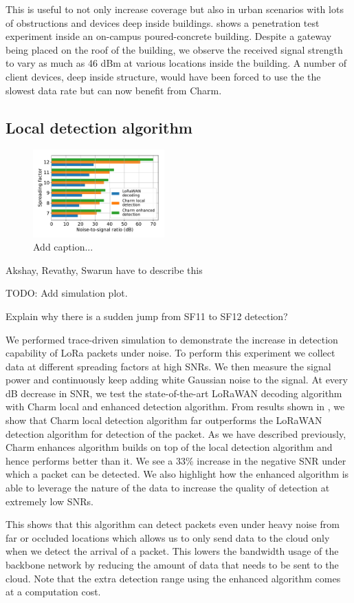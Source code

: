 This is useful to not only increase coverage but also in urban scenarios with lots of obstructions and devices deep inside buildings.  shows a penetration test experiment inside an on-campus poured-concrete building. Despite a gateway being placed on the roof of the building, we observe the received signal strength to vary as much as 46 dBm at various locations inside the building. A number of client devices, deep inside structure, would have been forced to use the the slowest data rate but can now benefit from Charm.

\subsection{Local detection algorithm}
\label{sec:local-detection-eval}

\begin{figure}[!ht]
\centering
\includegraphics[width=0.45\textwidth]{figures/local_detection_limits}
\caption{{\color{blue} Add caption...}}
\label{fig:local-detection}
\end{figure}

{\color{blue} Akshay, Revathy, Swarun have to describe this

TODO: Add simulation plot.

Explain why there is a sudden jump from SF11 to SF12 detection?}

{\color{purple}
We performed trace-driven simulation to demonstrate the increase in detection capability of LoRa packets under noise. To perform this experiment we collect data at different spreading factors at high SNRs. We then measure the signal power and continuously keep adding white Gaussian noise to the signal. At every dB decrease in SNR, we test the state-of-the-art LoRaWAN decoding algorithm with Charm local and enhanced detection algorithm. From results shown in , we show that Charm local detection algorithm far outperforms the LoRaWAN detection algorithm for detection of the packet. As we have described previously, Charm enhances algorithm builds on top of the local detection algorithm and hence performs better than it. We see a 33\% increase in the negative SNR under which a packet can be detected. We also highlight how the enhanced algorithm is able to leverage the nature of the data to increase the quality of detection at extremely low SNRs. 

This shows that this algorithm can detect packets even under heavy noise from far or occluded locations which allows us to only send data to the cloud only when we detect the arrival of a packet. This lowers the bandwidth usage of the backbone network by reducing the amount of data that needs to be sent to the cloud. Note that the extra detection range using the enhanced algorithm comes at a computation cost.
}


